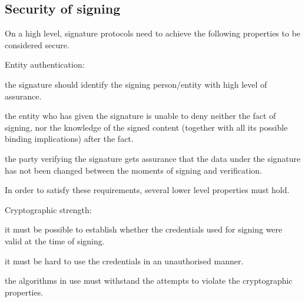 \subsection{Security of signing}

On a high level, signature protocols need to achieve the following properties to be considered secure.

\begin{labeling}{Entity authentication:}
    \item[Entity authentication:] the signature should identify the signing person/entity with high level of assurance.
    \item[Non-repudiation:] the entity who has given the signature is unable to deny neither the fact of signing, nor the knowledge of the signed content (together with all its possible binding implications) after the fact. 
    \item[Data integrity:] the party verifying the signature gets assurance that the data under the signature has not been changed between the moments of signing and verification.
\end{labeling}

In order to satisfy these requirements, several lower level properties must hold.

\begin{labeling}{Cryptographic strength:}
    \item[Credential validity:] it must be possible to establish whether the credentials used for signing were valid at the time of signing.
    \item[Authorised usage:] it must be hard to use the credentials in an unauthorised manner.
    \item[Cryptographic strength:] the algorithms in use must withstand the attempts to violate the cryptographic properties.
\end{labeling}

